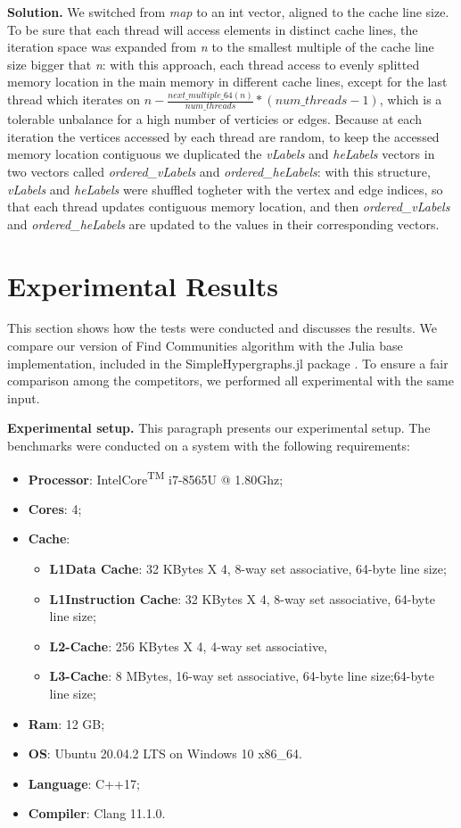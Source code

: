 \documentclass[conference]{IEEEtran}
\newcommand{\mypar}[1]{{\bf #1.}}
\begin{document}
\mypar{Solution}
We switched from \textit{map} to an int vector, aligned to the cache line size. To be sure that each thread will access elements in distinct cache lines, the iteration space was expanded from \textit{n} to the smallest multiple of the cache line size bigger that \textit{n}: with this approach, each thread access to evenly splitted memory location in the main memory in different cache lines, except for the last thread which iterates on $ n - \frac{next\_multiple\_64(n)}{num\_threads}*({num\_threads-1}) $, which is a tolerable unbalance for a high number of verticies or edges.  
Because at each iteration the vertices accessed by each thread are random, to keep the accessed memory location contiguous we duplicated the \textit{vLabels} and \textit{heLabels} vectors in two vectors called \textit{ordered\_vLabels} and \textit{ordered\_heLabels}: with this structure, \textit{vLabels} and \textit{heLabels} were shuffled togheter with the vertex and edge indices, so that each thread updates contiguous memory location, and then \textit{ordered\_vLabels} and \textit{ordered\_heLabels} are updated to the values in their corresponding vectors.

\section{Experimental Results}\label{sec:exp}

This section shows how the tests were conducted and discusses the results. We compare our version of Find Communities algorithm with the Julia base implementation, included in the SimpleHypergraphs.jl package \cite{SH.jl}. 
To ensure a fair comparison among the competitors, we performed all experimental with the same input.

\mypar{Experimental setup} This paragraph presents our experimental setup. The benchmarks were conducted on a system with the following requirements: 
\begin{itemize}
    \item \textbf{Processor}: Intel\textregistered\;Core\textsuperscript{TM} i7-8565U @ 1.80Ghz;
    \item \textbf{Cores}: 4;
    \item \textbf{Cache}:
    \begin{itemize}
        \item \textbf{L1Data Cache}: 32 KBytes X 4, 8-way set associative, 64-byte line size;
        \item \textbf{L1Instruction Cache}: 32 KBytes X 4, 8-way set associative, 64-byte line size;
        \item \textbf{L2-Cache}: 256 KBytes X 4, 4-way set associative, 
        \item \textbf{L3-Cache}: 8 MBytes, 16-way set associative, 64-byte line size;64-byte line size;
    \end{itemize}
    \item \textbf{Ram}: 12 GB;
    \item \textbf{OS}: Ubuntu 20.04.2 LTS on Windows 10 x86\_64.
    \item \textbf{Language}: C++17;
    \item \textbf{Compiler}: Clang 11.1.0.
\end{itemize}
\end{document}
